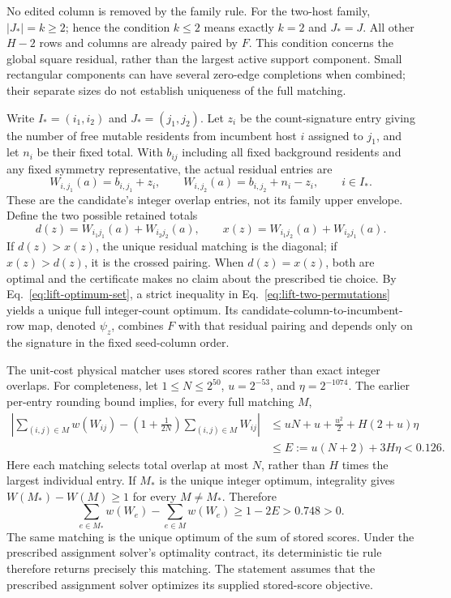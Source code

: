 \documentclass[11pt]{article}
\begin{document}
No edited column is removed by the family rule. For the two-host family, $|J_*|=k\ge2$; hence the condition $k\le2$ means exactly $k=2$ and $J_*=J$. All other $H-2$ rows and columns are already paired by $F$. This condition concerns the global square residual, rather than the largest active support component. Small rectangular components can have several zero-edge completions when combined; their separate sizes do not establish uniqueness of the full matching.

Write $I_*=(i_1,i_2)$ and $J_*=(j_1,j_2)$. Let $z_i$ be the count-signature entry giving the number of free mutable residents from incumbent host $i$ assigned to $j_1$, and let $n_i$ be their fixed total. With $b_{ij}$ including all fixed background residents and any fixed symmetry representative, the actual residual entries are
\begin{equation}\label{eq:lift-residual-entries}
W_{i,j_1}(a)=b_{i,j_1}+z_i,\qquad W_{i,j_2}(a)=b_{i,j_2}+n_i-z_i,\qquad i\in I_*.
\end{equation}
These are the candidate's integer overlap entries, not its family upper envelope. Define the two possible retained totals
\begin{equation}\label{eq:lift-two-permutations}
d(z)=W_{i_1j_1}(a)+W_{i_2j_2}(a),\qquad x(z)=W_{i_1j_2}(a)+W_{i_2j_1}(a).
\end{equation}
If $d(z)>x(z)$, the unique residual matching is the diagonal; if $x(z)>d(z)$, it is the crossed pairing. When $d(z)=x(z)$, both are optimal and the certificate makes no claim about the prescribed tie choice. By Eq.~\eqref{eq:lift-optimum-set}, a strict inequality in Eq.~\eqref{eq:lift-two-permutations} yields a unique full integer-count optimum. Its candidate-column-to-incumbent-row map, denoted $\psi_z$, combines $F$ with that residual pairing and depends only on the signature in the fixed seed-column order.

The unit-cost physical matcher uses stored scores rather than exact integer overlaps. For completeness, let $1\le N\le2^{50}$, $u=2^{-53}$, and $\eta=2^{-1074}$. The earlier per-entry rounding bound implies, for every full matching $M$,
\begin{align}
\left|\sum_{(i,j)\in M}w(W_{ij})-\left(1+\frac1{2N}\right)\sum_{(i,j)\in M}W_{ij}\right|
&\le uN+u+\frac{u^2}{2}+H(2+u)\eta\nonumber\\
&\le E:=u(N+2)+3H\eta<0.126.\label{eq:lift-score-error}
\end{align}
Here each matching selects total overlap at most $N$, rather than $H$ times the largest individual entry. If $M_*$ is the unique integer optimum, integrality gives $W(M_*)-W(M)\ge1$ for every $M\ne M_*$. Therefore
\begin{equation}\label{eq:lift-score-gap}
\sum_{e\in M_*}w(W_e)-\sum_{e\in M}w(W_e)\ge1-2E>0.748>0.
\end{equation}
The same matching is the unique optimum of the sum of stored scores. Under the prescribed assignment solver's optimality contract, its deterministic tie rule therefore returns precisely this matching. The statement assumes that the prescribed assignment solver optimizes its supplied stored-score objective.
\end{document}
